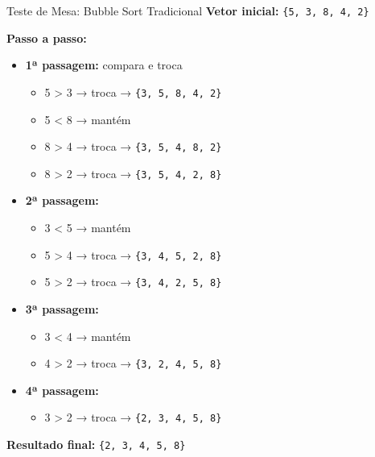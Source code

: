 \documentclass{beamer}
\begin{document}
\begin{frame}{Teste de Mesa: Bubble Sort Tradicional}
\textbf{Vetor inicial:} \texttt{\{5, 3, 8, 4, 2\}}

\vspace{0.5em}
\textbf{Passo a passo:}

\begin{itemize}
    \item \textbf{1ª passagem:} compara e troca
    \begin{itemize}
        \item 5 > 3 → troca → \texttt{\{3, 5, 8, 4, 2\}}
        \item 5 < 8 → mantém
        \item 8 > 4 → troca → \texttt{\{3, 5, 4, 8, 2\}}
        \item 8 > 2 → troca → \texttt{\{3, 5, 4, 2, 8\}}
    \end{itemize}
    \item \textbf{2ª passagem:}
    \begin{itemize}
        \item 3 < 5 → mantém
        \item 5 > 4 → troca → \texttt{\{3, 4, 5, 2, 8\}}
        \item 5 > 2 → troca → \texttt{\{3, 4, 2, 5, 8\}}
    \end{itemize}
    \item \textbf{3ª passagem:}
    \begin{itemize}
        \item 3 < 4 → mantém
        \item 4 > 2 → troca → \texttt{\{3, 2, 4, 5, 8\}}
    \end{itemize}
    \item \textbf{4ª passagem:}
    \begin{itemize}
        \item 3 > 2 → troca → \texttt{\{2, 3, 4, 5, 8\}}
    \end{itemize}
\end{itemize}

\vspace{0.5em}
\textbf{Resultado final:} \texttt{\{2, 3, 4, 5, 8\}}
\end{frame}
\end{document}
